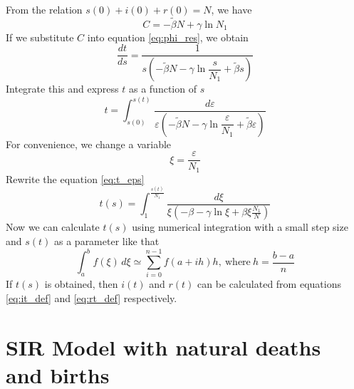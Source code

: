 \documentclass[12pt, a4paper]{article}
\begin{document}
	\newpage
	
	From the relation $s(0) + i(0) + r(0) = N$, we have
	\begin{equation}
		C = -\tilde{\beta}N + \gamma \ln{N_1}
	\end{equation}
	If we substitute $C$ into equation \eqref{eq:phi_res}, we obtain
	\begin{equation}
		\frac{dt}{ds} = \frac{1}{s(-\tilde{\beta}N - \gamma \ln{\dfrac{s}{N_1} + \tilde{\beta}s})}
	\end{equation}
	Integrate this and express $t$ as a function of $s$
	\begin{equation} \label{eq:t_eps}
		t = \int_{s(0)}^{s(t)} \frac{d \varepsilon}{\varepsilon(-\tilde{\beta}N - \gamma \ln{\dfrac{\varepsilon}{N_1}} + \tilde{\beta} \varepsilon)}
	\end{equation}
	For convenience, we change a variable
	\begin{equation}
		\xi = \frac{\varepsilon}{N_1}
	\end{equation}
	Rewrite the equation \eqref{eq:t_eps}
	\begin{equation}
		t(s) = \int_{1}^{\frac{s(t)}{N_1}} \frac{d \xi}{\xi(-\beta - \gamma \ln{\xi} + \beta \xi \frac{N_1}{N})}		
	\end{equation}
	Now we can calculate $t(s)$ using numerical integration with a small step size and $s(t)$ as a parameter like that
	\begin{equation}
		\int_{a}^{b} f(\xi) \,d\xi \simeq \sum_{i=0}^{n-1} f(a + ih)h,~ \text{where} ~ h = \frac{b-a}{n}
	\end{equation}
	If $t(s)$ is obtained, then $i(t)$ and $r(t)$ can be calculated from equations \eqref{eq:it_def} and \eqref{eq:rt_def} respectively.
	
	\newpage

	\section{SIR Model with natural deaths and births}
\end{document}
